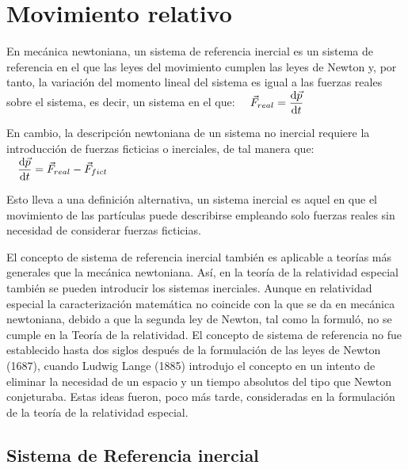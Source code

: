 \chapter{Movimiento relativo}

\begin{miparrafo}

En mecánica newtoniana, un sistema de referencia inercial es un sistema de referencia en el que las leyes del movimiento cumplen las leyes de Newton y, por tanto, la variación del momento lineal del sistema es igual a las fuerzas reales sobre el sistema, es decir, un sistema en el que:
$\quad \vec F_{real} = \displaystyle \dv{\vec p}{t}$


\vspace{2mm} En cambio, la descripción newtoniana de un sistema no inercial requiere la introducción de fuerzas ficticias o inerciales, de tal manera que:
$\quad \displaystyle \dv{\vec p}{t}=\vec {F} _{real}-\vec {F}_{fict}$

\vspace{2mm} Esto lleva a una definición alternativa, un sistema inercial es aquel en que el movimiento de las partículas puede describirse empleando solo fuerzas reales sin necesidad de considerar fuerzas ficticias.

\vspace{2mm} El concepto de sistema de referencia inercial también es aplicable a teorías más generales que la mecánica newtoniana. Así, en la teoría de la relatividad especial también se pueden introducir los sistemas inerciales. Aunque en relatividad especial la caracterización matemática no coincide con la que se da en mecánica newtoniana, debido a que la segunda ley de Newton, tal como la formuló, no se cumple en la Teoría de la relatividad. El concepto de sistema de referencia no fue establecido hasta dos siglos después de la formulación de las leyes de Newton (1687), cuando Ludwig Lange (1885) introdujo el concepto en un intento de eliminar la necesidad de un espacio y un tiempo absolutos del tipo que Newton conjeturaba. Estas ideas fueron, poco más tarde, consideradas en la formulación de la teoría de la relatividad especial.
	
\end{miparrafo}


\section{Sistema de Referencia inercial}

